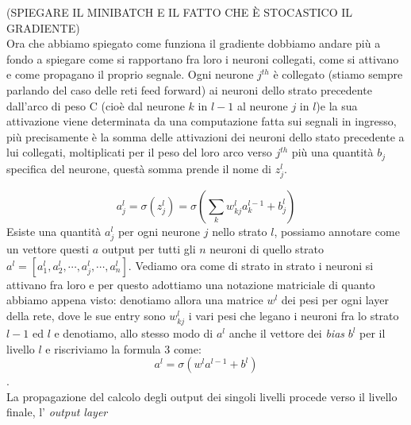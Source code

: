 (SPIEGARE IL MINIBATCH E IL FATTO CHE È STOCASTICO IL GRADIENTE)
\\
Ora che abbiamo spiegato come funziona il gradiente dobbiamo andare più a fondo a spiegare come si rapportano fra loro i neuroni collegati, come si attivano e come propagano il proprio segnale.
Ogni neurone $j^{th}$ è collegato (stiamo sempre parlando del caso delle reti feed forward) ai neuroni dello strato precedente dall'arco di peso C (cioè dal neurone $k$ in $l-1$ al neurone $j$ in $l$)e la sua attivazione viene determinata da una computazione fatta sui segnali in ingresso, più precisamente è la somma delle attivazioni dei neuroni dello stato precedente a lui collegati, moltiplicati per il peso del loro arco verso $j^{th}$ più una quantità $b_{j}$ specifica del neurone, questà somma prende il nome di $z^{l}_{j}$. 

\begin{equation}
\displaystyle a^{l}_{j}=\sigma\left( z^{l}_{j}\right) = \sigma \left( \sum_{k}w^{l}_{kj}a^{l-1}_k +b^{l}_{j} \right)
\end{equation}
Esiste una quantità $ a^{l}_{j} $ per ogni neurone $j$ nello strato $l$, possiamo annotare come un vettore questi $a$ output per tutti gli $n$ neuroni di quello strato $a^{l} = \left[a^{l}_{1},a^{l}_{2}, \cdots, a^{l}_{j}, \cdots, a^{l}_{n}  \right] $. Vediamo ora come di strato in strato i neuroni si attivano fra loro e per questo adottiamo una notazione matriciale di quanto abbiamo appena visto: denotiamo allora una matrice $w^{l}$ dei pesi per ogni layer della rete, dove le sue entry sono $w^{l}_{kj}$ i vari pesi che legano i neuroni fra lo strato $l-1$ ed $l$ e denotiamo, allo stesso modo di $a^{l}$ anche il vettore dei \textit{bias} $b^{l}$ per il livello $l$ e riscriviamo la formula 3 come:
\begin{equation}
	a^{l}=\sigma\left( w^{l}a^{l-1}+b^{l}\right)
\end{equation} . 
\\
La propagazione del calcolo degli output dei singoli livelli procede verso il livello finale, l' \textit{output layer}





